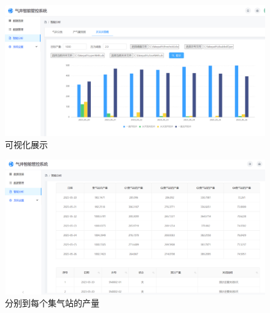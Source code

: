 \begin{figure}[H]
    \centering
    \includegraphics[width=.99\linewidth]{figure/开关井预测-图片.pdf}
    \caption{可视化展示}
    \label{fig:openre}
\end{figure}
\begin{figure}[H]
    \centering
    \includegraphics[width=.99\linewidth]{figure/开关井推荐-各集气站产量.pdf}
    \caption{分别到每个集气站的产量}
    \label{fig:stationprog}
\end{figure}

